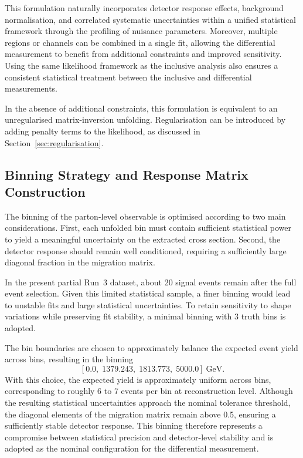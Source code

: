 This formulation naturally incorporates detector response effects, background normalisation, and correlated systematic uncertainties within a unified statistical framework through the profiling of nuisance parameters. 
Moreover, multiple regions or channels can be combined in a single fit, allowing the differential measurement to benefit from additional constraints and improved sensitivity. 
Using the same likelihood framework as the inclusive analysis also ensures a consistent statistical treatment between the inclusive and differential measurements.

In the absence of additional constraints, this formulation is equivalent to an unregularised matrix-inversion unfolding. 
Regularisation can be introduced by adding penalty terms to the likelihood, as discussed in Section~\ref{sec:regularisation}.


\subsection{Binning Strategy and Response Matrix Construction}

The binning of the parton-level observable is optimised according to two main considerations. 
First, each unfolded bin must contain sufficient statistical power to yield a meaningful uncertainty on the extracted cross section. 
Second, the detector response should remain well conditioned, requiring a sufficiently large diagonal fraction in the migration matrix.

In the present partial Run~3 dataset, about 20 signal events remain after the full event selection. 
Given this limited statistical sample, a finer binning would lead to unstable fits and large statistical uncertainties. 
To retain sensitivity to shape variations while preserving fit stability, a minimal binning with 3 truth bins is adopted.

The bin boundaries are chosen to approximately balance the expected event yield across bins, resulting in the binning
\[
[0.0,\; 1379.243,\; 1813.773,\; 5000.0]~\mathrm{GeV}.
\]
With this choice, the expected yield is approximately uniform across bins, corresponding to roughly 6 to 7 events per bin at reconstruction level. 
Although the resulting statistical uncertainties approach the nominal tolerance threshold, the diagonal elements of the migration matrix remain above 0.5, ensuring a sufficiently stable detector response.
This binning therefore represents a compromise between statistical precision and detector-level stability and is adopted as the nominal configuration for the differential measurement.

